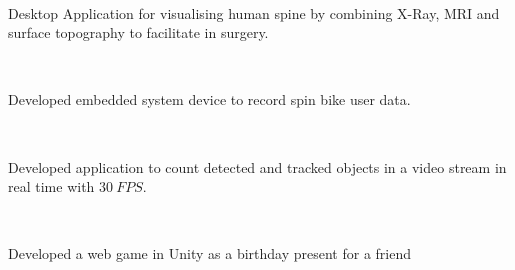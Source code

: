 \documentclass[]{allanwang-resume}
\begin{document}
\begin{minipage}[t]{0.66\textwidth}
	 \\
	\begin{tightemize}
		\item Desktop Application for visualising human spine by combining X-Ray, MRI and surface topography to facilitate in surgery. 
	\end{tightemize}

	 \\
	\begin{tightemize}
		\item Developed embedded system device to record spin bike user data.
	\end{tightemize}

	 \\
	\begin{tightemize}
		\item Developed application to count detected and tracked objects in a video stream in real time with $30 \ FPS$.
	\end{tightemize}

	 \\
	\begin{tightemize}
		\item Developed a web game in Unity as a birthday present for a friend
	\end{tightemize}

\end{minipage}
\end{document}
